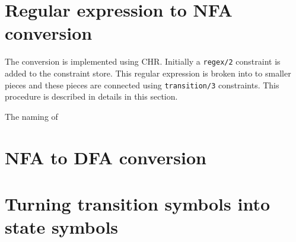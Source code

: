 \documentclass{report}
\begin{document}
\section{Regular expression to NFA conversion}

The conversion is implemented using CHR. Initially a \verb|regex/2| constraint is 
added to the constraint store. This regular expression is broken into 
to smaller pieces and these pieces are connected using \verb|transition/3| constraints.
This procedure is described in details in this section.

The naming of 

\section{NFA to DFA conversion}

\section{Turning transition symbols into state symbols}
\end{document}
